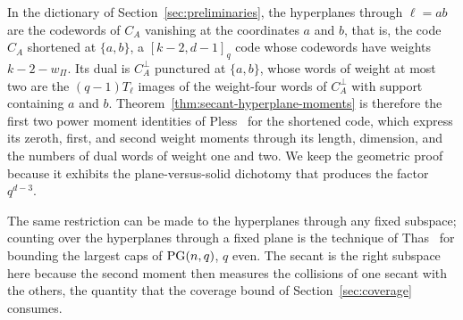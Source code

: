 \begin{remark}
In the dictionary of Section~\ref{sec:preliminaries}, the hyperplanes
through \(\ell=ab\) are the codewords of \(C_A\) vanishing at the
coordinates \(a\) and \(b\), that is, the code \(C_A\) shortened at
\(\{a,b\}\), a \([k-2,d-1]_q\) code whose codewords have weights
\(k-2-w_\Pi\).  Its dual is \(C_A^\perp\) punctured at \(\{a,b\}\), whose
words of weight at most two are the \((q-1)T_\ell\) images of the
weight-four words of \(C_A^\perp\) with support containing \(a\) and
\(b\).  Theorem~\ref{thm:secant-hyperplane-moments} is therefore the
first two power moment identities of Pless~\cite{Pless1963} for the
shortened code, which express its zeroth, first, and second weight
moments through its length, dimension, and the numbers of dual words of
weight one and two.  We keep the geometric proof because it exhibits the
plane-versus-solid dichotomy that produces the factor \(q^{d-3}\).
\end{remark}

The same restriction can be made to the hyperplanes through any fixed
subspace; counting over the hyperplanes through a fixed plane is the
technique of Thas~\cite{Thas2017} for bounding the largest caps of
\(\mathrm{PG}(n,q)\), \(q\) even.  The secant is the right subspace here because
the second moment then measures the collisions of one secant with the
others, the quantity that the coverage bound of
Section~\ref{sec:coverage} consumes.
